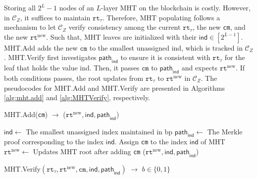 Storing all $2^{L}-1$ nodes of an $L$-layer \textsf{MHT} on the blockchain is costly. However, in $\mathcal{C}_Z$, it suffices to maintain $\texttt{rt}_\tau$. Therefore, \textsf{MHT} populating follows a  mechanism to let $\mathcal{C}_Z$ verify consistency among the current $\texttt{rt}_\tau$, the new \texttt{cm}, and the new $\texttt{rt}^\text{new}$. Such that, 
\textsf{MHT} leaves are initialized with their  $\textsf{ind} \in [ 2^{L-1}]$. 
\textsf{MHT}.\textsf{Add} adds the new $\texttt{cm}$ to the smallest unassigned \textsf{ind}, which is tracked in $\mathcal{C}_Z$. \textsf{MHT}.\textsf{Verify} first investigates $\textsf{path}_\textsf{ind}$ to ensure it is consistent with $\texttt{rt}_\tau$ for the leaf that holds the value \textsf{ind}.
Then, it passes $\texttt{cm}$ to $\textsf{path}_\textsf{ind}$ and expects $\texttt{rt}^\text{new}$. If both conditions passes, the root  updates from $\texttt{rt}_{\tau}$ to $ \texttt{rt}^\text{new}$ in $\mathcal{C}_Z$. The pseudocodes for \textsf{MHT}.\textsf{Add} and \textsf{MHT}.\textsf{Verify} are presented in Algorithms \ref{alg:mht.add} and \ref{alg:ٰMHTVerify}, respectively.


\begin{algorithm}
\caption{\textsf{MHT}.\textsf{Add}(\texttt{cm}) $\rightarrow$ ($\texttt{rt}^{\text{new}}, \textsf{ind}, \textsf{path}_\textsf{ind}$) }\label{alg:mht.add}
\begin{algorithmic}[1]
\State $\mathsf{ind} \gets $ The smallest unassigned index maintained in \gls{bp}
\State $\textsf{path}_\textsf{ind} \gets $ The Merkle proof corresponding to the index $\mathsf{ind}$.
\State Assign \texttt{cm} to the index $\mathsf{ind}$ of \textsf{MHT}
\State $\texttt{rt}^{\text{new} }\gets$ {Updates \textsf{MHT} root after adding \texttt{cm}}
\State \Return ($\texttt{rt}^{\text{new}}, \textsf{ind}, \textsf{path}_\textsf{ind}$)
\end{algorithmic}
\end{algorithm}


%

\begin{algorithm}
    \caption{\textsf{MHT}.\textsf{Verify}$(\texttt{rt}_{\tau}, \texttt{rt}^{\text{new}}, \texttt{cm}, \mathsf{ind}, \mathsf{path}_\mathsf{ind})$ $ \rightarrow $ $b \in \{0, 1\}$ }\label{alg:ٰMHTVerify}
	\begin{algorithmic}[1]
		\State {}
		\EndIf
		\State {}
		\EndIf
  
		\State {}
	\end{algorithmic}
\end{algorithm}


